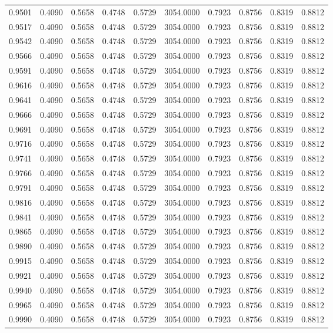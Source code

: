 \begin{tabular}{rrrrrrrrrr}
0.9501 & 0.4090 & 0.5658 & 0.4748 & 0.5729 & 3054.0000 & 0.7923 & 0.8756 & 0.8319 & 0.8812 \\
0.9517 & 0.4090 & 0.5658 & 0.4748 & 0.5729 & 3054.0000 & 0.7923 & 0.8756 & 0.8319 & 0.8812 \\
0.9542 & 0.4090 & 0.5658 & 0.4748 & 0.5729 & 3054.0000 & 0.7923 & 0.8756 & 0.8319 & 0.8812 \\
0.9566 & 0.4090 & 0.5658 & 0.4748 & 0.5729 & 3054.0000 & 0.7923 & 0.8756 & 0.8319 & 0.8812 \\
0.9591 & 0.4090 & 0.5658 & 0.4748 & 0.5729 & 3054.0000 & 0.7923 & 0.8756 & 0.8319 & 0.8812 \\
0.9616 & 0.4090 & 0.5658 & 0.4748 & 0.5729 & 3054.0000 & 0.7923 & 0.8756 & 0.8319 & 0.8812 \\
0.9641 & 0.4090 & 0.5658 & 0.4748 & 0.5729 & 3054.0000 & 0.7923 & 0.8756 & 0.8319 & 0.8812 \\
0.9666 & 0.4090 & 0.5658 & 0.4748 & 0.5729 & 3054.0000 & 0.7923 & 0.8756 & 0.8319 & 0.8812 \\
0.9691 & 0.4090 & 0.5658 & 0.4748 & 0.5729 & 3054.0000 & 0.7923 & 0.8756 & 0.8319 & 0.8812 \\
0.9716 & 0.4090 & 0.5658 & 0.4748 & 0.5729 & 3054.0000 & 0.7923 & 0.8756 & 0.8319 & 0.8812 \\
0.9741 & 0.4090 & 0.5658 & 0.4748 & 0.5729 & 3054.0000 & 0.7923 & 0.8756 & 0.8319 & 0.8812 \\
0.9766 & 0.4090 & 0.5658 & 0.4748 & 0.5729 & 3054.0000 & 0.7923 & 0.8756 & 0.8319 & 0.8812 \\
0.9791 & 0.4090 & 0.5658 & 0.4748 & 0.5729 & 3054.0000 & 0.7923 & 0.8756 & 0.8319 & 0.8812 \\
0.9816 & 0.4090 & 0.5658 & 0.4748 & 0.5729 & 3054.0000 & 0.7923 & 0.8756 & 0.8319 & 0.8812 \\
0.9841 & 0.4090 & 0.5658 & 0.4748 & 0.5729 & 3054.0000 & 0.7923 & 0.8756 & 0.8319 & 0.8812 \\
0.9865 & 0.4090 & 0.5658 & 0.4748 & 0.5729 & 3054.0000 & 0.7923 & 0.8756 & 0.8319 & 0.8812 \\
0.9890 & 0.4090 & 0.5658 & 0.4748 & 0.5729 & 3054.0000 & 0.7923 & 0.8756 & 0.8319 & 0.8812 \\
0.9915 & 0.4090 & 0.5658 & 0.4748 & 0.5729 & 3054.0000 & 0.7923 & 0.8756 & 0.8319 & 0.8812 \\
0.9921 & 0.4090 & 0.5658 & 0.4748 & 0.5729 & 3054.0000 & 0.7923 & 0.8756 & 0.8319 & 0.8812 \\
0.9940 & 0.4090 & 0.5658 & 0.4748 & 0.5729 & 3054.0000 & 0.7923 & 0.8756 & 0.8319 & 0.8812 \\
0.9965 & 0.4090 & 0.5658 & 0.4748 & 0.5729 & 3054.0000 & 0.7923 & 0.8756 & 0.8319 & 0.8812 \\
0.9990 & 0.4090 & 0.5658 & 0.4748 & 0.5729 & 3054.0000 & 0.7923 & 0.8756 & 0.8319 & 0.8812 \\
\bottomrule
\end{tabular}
